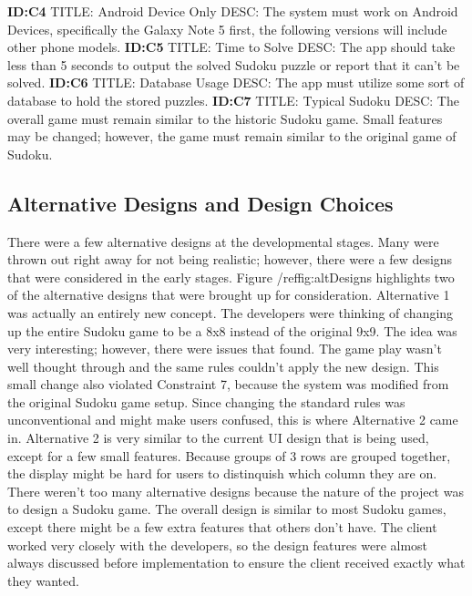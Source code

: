 \documentclass{article}
\begin{document}
\textbf{ID:C4} \newline TITLE: Android Device Only \newline DESC: The system must work on Android Devices, specifically the Galaxy Note 5 first, the following versions will include other phone models.\newline\newline
\textbf{ID:C5} \newline TITLE: Time to Solve \newline DESC: The app should take less than 5 seconds to output the solved Sudoku puzzle or report that it can't be solved.\newline\newline
\textbf{ID:C6} \newline TITLE: Database Usage \newline DESC: The app must utilize some sort of database to hold the stored puzzles.\newline\newline
\textbf{ID:C7} \newline TITLE: Typical Sudoku \newline DESC: The overall game must remain similar to the historic Sudoku game. Small features may be changed; however, the game must remain similar to the original game of Sudoku.\newline\newline


\subsection{Alternative Designs and Design Choices}
There were a few alternative designs at the developmental stages. Many were thrown out right away for not being realistic; however, there were a few designs that were considered in the early stages. Figure /ref{fig:altDesigns} highlights two of the alternative designs that were brought up for consideration. Alternative 1 was actually an entirely new concept. The developers were thinking of changing up the entire Sudoku game to be a 8x8 instead of the original 9x9. The idea was very interesting; however, there were issues that found. The game play wasn't well thought through and the same rules couldn't apply the new design. This small change also violated Constraint 7, because the system was modified from the original Sudoku game setup. Since changing the standard rules was unconventional and might make users confused, this is where Alternative 2 came in. Alternative 2 is very similar to the current UI design that is being used, except for a few small features. Because groups of 3 rows are grouped together, the display might be hard for users to distinquish which column they are on. There weren't too many alternative designs because the nature of the project was to design a Sudoku game. The overall design is similar to most Sudoku games, except there might be a few extra features that others don't have. The client worked very closely with the developers, so the design features were almost always discussed before implementation to ensure the client received exactly what they wanted.
\end{document}

